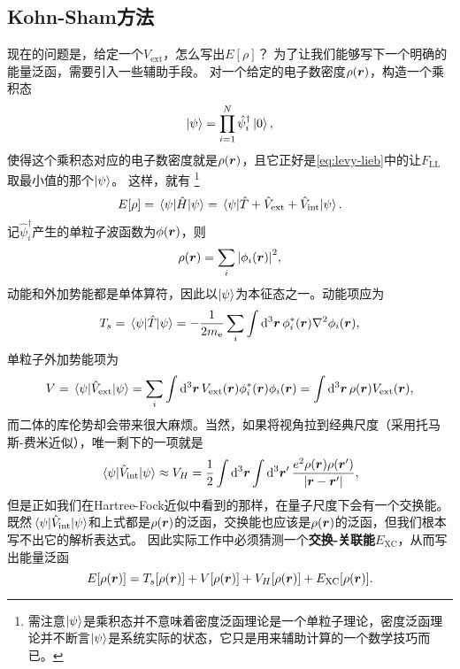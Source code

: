 \documentclass[hyperref, UTF8, a4paper]{ctexart}
\begin{document}
\subsection{Kohn-Sham方法}

现在的问题是，给定一个$V_\text{ext}$，怎么写出$E[\rho]$？
为了让我们能够写下一个明确的能量泛函，需要引入一些辅助手段。
对一个给定的电子数密度$\rho(\vb*{r})$，构造一个乘积态
\begin{equation}
    \ket{\psi} = \prod_{i=1}^N \hat{\psi}^\dagger_i \ket{0},
\end{equation}
使得这个乘积态对应的电子数密度就是$\rho(\vb*{r})$，且它正好是\eqref{eq:levy-lieb}中的让$F_\text{LL}$取最小值的那个$\ket{\psi}$。
这样，就有%
\footnote{需注意$\ket{\psi}$是乘积态并不意味着密度泛函理论是一个单粒子理论，密度泛函理论并不断言$\ket{\psi}$是系统实际的状态，它只是用来辅助计算的一个数学技巧而已。}%
\begin{equation}
    E[\rho] = \mel{\psi}{\hat{H}}{\psi} = \mel{\psi}{\hat{T} + \hat{V}_\text{ext} + \hat{V}_\text{int}}{\psi}.
\end{equation}
记$\hat{\psi}_i^\dagger$产生的单粒子波函数为$\phi(\vb*{r})$，则
\begin{equation}
    \rho(\vb*{r}) = \sum_i \abs{\phi_i(\vb*{r})}^2,
    \label{eq:kohn-sham-density}
\end{equation}
动能和外加势能都是单体算符，因此以$\ket{\psi}$为本征态之一。动能项应为
\begin{equation}
    T_s = \mel{\psi}{\hat{T}}{\psi} = - \frac{1}{2m_\text{e}} \sum_i \int \dd[3]{\vb*{r}} \phi_i^*(\vb*{r}) \laplacian \phi_i(\vb*{r}),
\end{equation}
单粒子外加势能项为
\begin{equation}
    V = \mel{\psi}{\hat{V}_\text{ext}}{\psi} = \sum_i \int \dd[3]{\vb*{r}} V_{\text{ext}}(\vb*{r}) \phi_i^*(\vb*{r}) \phi_i(\vb*{r}) = \int \dd[3]{\vb*{r}} \rho(\vb*{r}) V_\text{ext}(\vb*{r}),
\end{equation}
而二体的库伦势却会带来很大麻烦。当然，如果将视角拉到经典尺度（采用托马斯-费米近似），唯一剩下的一项就是
\[
    \mel{\psi}{\hat{V}_\text{int}}{\psi} \approx V_H = \frac{1}{2} \int \dd[3]{\vb*{r}} \int \dd[3]{\vb*{r}'} \frac{e^2 \rho(\vb*{r}) \rho(\vb*{r}')}{\abs{\vb*{r} - \vb*{r}'}},
\]
但是正如我们在Hartree-Fock近似中看到的那样，在量子尺度下会有一个交换能。既然$\mel{\psi}{\hat{V}_\text{int}}{\psi}$和上式都是$\rho(\vb*{r})$的泛函，交换能也应该是$\rho(\vb*{r})$的泛函，但我们根本写不出它的解析表达式。
因此实际工作中必须猜测一个\textbf{交换-关联能}$E_\text{XC}$，从而写出能量泛函
\begin{equation}
    E[\rho(\vb*{r})] = T_s[\rho(\vb*{r})] + V[\rho(\vb*{r})] + V_H[\rho(\vb*{r})] + E_\text{XC} [\rho(\vb*{r})].
    \label{eq:kohn-sham-functional}
\end{equation}
\end{document}
